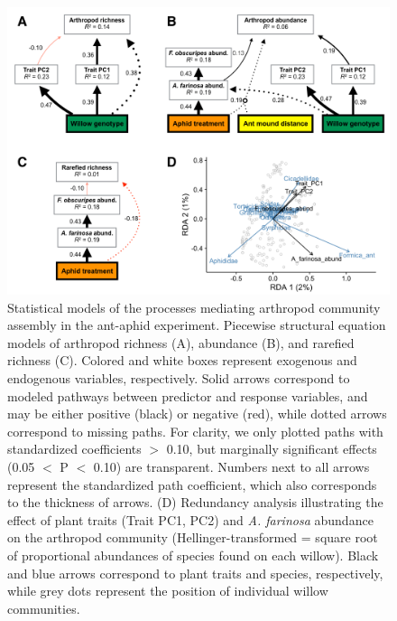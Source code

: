 \documentclass[11pt]{article}
\begin{document}
\begin{figure}%
\centering
\includegraphics[scale = 0.45]{fig_3.png}
\caption{Statistical models of the processes mediating
arthropod community assembly in the ant-aphid experiment. Piecewise
structural equation models of arthropod richness (A), abundance (B), and
rarefied richness (C). Colored and white boxes represent exogenous and
endogenous variables, respectively. Solid arrows
correspond to modeled pathways between predictor and response variables,
and may be either positive (black) or negative (red), while dotted arrows correspond to missing paths. For clarity,
we only plotted paths with standardized coefficients $>$
0.10, but marginally significant effects (0.05 $<$ P $<$ 0.10) are transparent. Numbers next to all arrows represent the standardized path
coefficient, which also corresponds to the thickness of arrows. (D)
Redundancy analysis illustrating the effect of plant traits (Trait PC1, PC2) and \textit{A. farinosa} abundance on the arthropod community (Hellinger-transformed = square root of proportional abundances of species found on each willow).
Black and blue arrows correspond to plant traits and species,
respectively, while grey dots represent the position of individual
willow communities.}
\label{aaSEM}
\end{figure}
\end{document}
